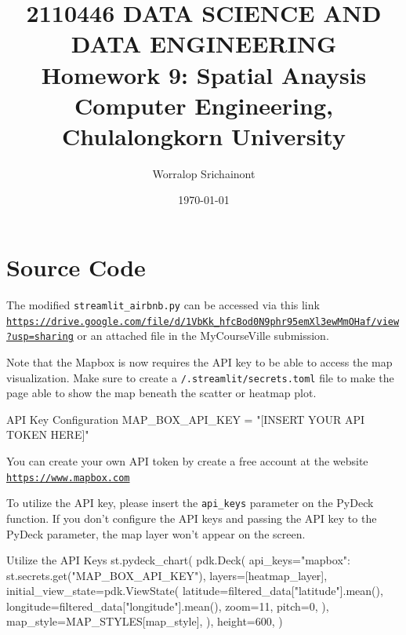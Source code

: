 \documentclass[12pt, a4paper]{article}
\title {
	\textbf{2110446 DATA SCIENCE AND DATA ENGINEERING} \\
    \vspace{1em}
	\Large{\textbf{Homework 9: Spatial Anaysis}} \\
    \vspace{0.5em}
    \large{Computer Engineering, Chulalongkorn University}
}
\author{Worralop Srichainont}
\date{\today}
\begin{document}
    \maketitle
    \thispagestyle{empty}
    \clearpage

    \tableofcontents
    \thispagestyle{empty}
    \clearpage


    \section{Source Code}

        The modified \texttt{streamlit\_airbnb.py} can be accessed via this link
        \texttt{\url{https://drive.google.com/file/d/1VbKk_hfcBod0N9phr95emXl3ewMmOHaf/view?usp=sharing}}
        or an attached file in the MyCourseVille submission.

        \vspace{1em}

        Note that the Mapbox is now requires the API key to be able to access the map visualization.
        Make sure to create a \texttt{/.streamlit/secrets.toml} file
        to make the page able to show the map beneath the scatter or heatmap plot.

        \begin{codeblock}{API Key Configuration}
            MAP_BOX_API_KEY = "[INSERT YOUR API TOKEN HERE]"
        \end{codeblock}

        You can create your own API token
        by create a free account at the website \texttt{\url{https://www.mapbox.com}}

        \vspace{1em}

        To utilize the API key, please insert the \texttt{api\_keys} parameter on the PyDeck function.
        If you don't configure the API keys and passing the API key to the PyDeck parameter,
        the map layer won't appear on the screen.

        \begin{codeblock}{Utilize the API Keys}
            st.pydeck_chart(
                pdk.Deck(
                    api_keys={"mapbox": st.secrets.get("MAP_BOX_API_KEY")},
                    layers=[heatmap_layer],
                    initial_view_state=pdk.ViewState(
                        latitude=filtered_data["latitude"].mean(),
                        longitude=filtered_data["longitude"].mean(),
                        zoom=11,
                        pitch=0,
                    ),
                    map_style=MAP_STYLES[map_style],
                ),
                height=600,
            )
        \end{codeblock}
\end{document}
